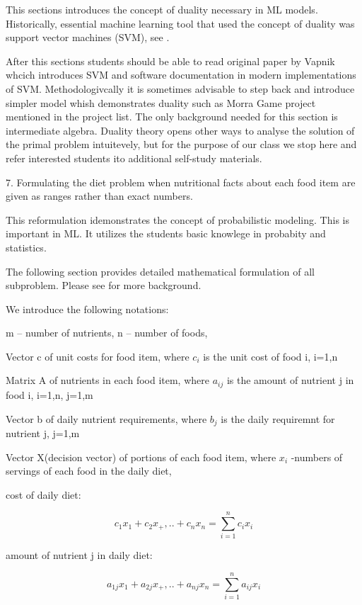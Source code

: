 \documentclass{article} %
\begin{document}
This sections introduces the concept of duality necessary in ML models. Historically, essential machine learning tool that used the concept of duality was support vector machines (SVM), see \cite{VC}.

After this sections students should be able to read original paper by Vapnik whcich introduces SVM and software documentation in modern implementations of SVM. Methodologivcally it is sometimes advisable to step back and introduce simpler model whish demonstrates duality such as Morra Game project mentioned in the project list. The only background needed for this section is intermediate algebra. Duality theory opens other ways to analyse the solution of the primal problem intuitevely, but for the purpose of our class we stop here and refer interested students ito additional self-study materials.

7. Formulating the diet problem when nutritional facts about each food item are given as ranges rather than exact numbers.

This reformulation idemonstrates the concept of probabilistic modeling. This is important in ML. It utilizes the students basic knowlege in probabity and statistics.

The following section provides detailed mathematical formulation of all subproblem. Please see \cite{RV} for more background.

We introduce the following notations:

m – number of nutrients, n – number of foods, 

Vector c of unit costs for food item, where  $c_i$ is the unit cost of food i, i=1,n

Matrix A of nutrients in each food item, where  $a_{ij}$ is the amount of nutrient j in food i, i=1,n, j=1,m

Vector b  of daily nutrient requirements, where $b_j$ is the daily  requiremnt for nutrient j, j=1,m

Vector X(decision vector)  of portions of each food item, where $x_i$ -numbers of servings of each food in the daily diet, 


cost of daily diet:

    \begin{equation} 
    c_1x_1+c_2x_+,..+ c_nx_n=\sum_{i=1}^{n}{c_ix_i}
    \end{equation}

amount of nutrient j in daily diet:

    \begin{equation} 
    a_{1j}x_1+a_{2j}x_+,..+ a_{nj}x_n=\sum_{i=1}^{n}{a_{ij}x_i}
    \end{equation}
\end{document}

